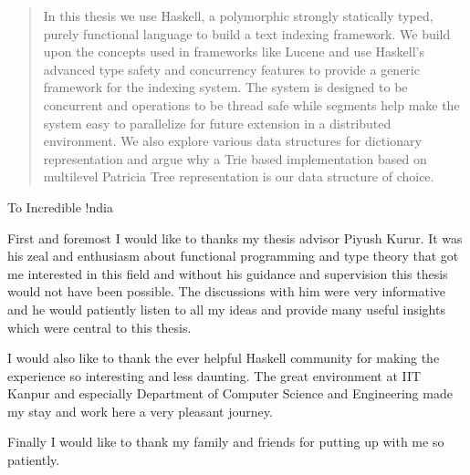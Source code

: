 \begin{abstract}
In this thesis we use Haskell, a polymorphic strongly statically typed, purely functional language to build a text indexing framework.
We build upon the concepts used in frameworks like Lucene and use Haskell's advanced type safety and concurrency features to
provide a generic framework for the indexing system.
The system is designed to be concurrent and operations to be thread safe while segments help
make the system easy to parallelize for future extension in a distributed environment.
We also explore various data structures for dictionary representation and argue why a Trie based implementation
based on multilevel Patricia Tree representation is our data structure of choice.
\end{abstract}

\begin{dedication}
To Incredible !ndia
\end{dedication}

\begin{acknowledgments}
First and foremost I would like to thanks my thesis advisor Piyush Kurur.
It was his zeal and enthusiasm about functional programming and type theory that got me interested in this field
and without his guidance and supervision this thesis would not have been possible.
The discussions with him were very informative and he would patiently listen to all my ideas and provide many useful insights
which were central to this thesis.

I would also like to thank the ever helpful Haskell community for making the experience so interesting and less daunting.
The great environment at IIT Kanpur and especially Department of Computer Science and Engineering made my stay and work here
a very pleasant journey.

Finally I would like to thank my family and friends for putting up with me so patiently.
\end{acknowledgments}

\tableofcontents
\listoftables

\cleardoublepage

\renewcommand\listingscaption{Program}
\renewcommand\listoflistingscaption{List of Programs}
\listoflistings

\listoffigures{}

\cleardoublepage
{} %

